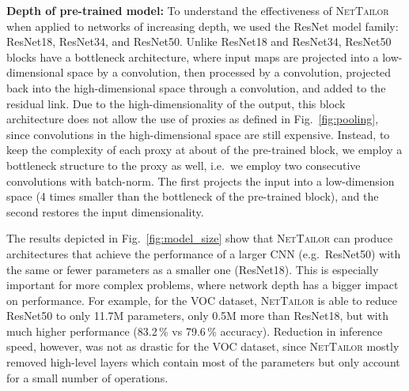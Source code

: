 \documentclass[10pt,twocolumn,letterpaper]{article}
\begin{document}
\noindent
\textbf{Depth of pre-trained model:}
To understand the effectiveness of \textsc{NetTailor} when applied to networks of increasing depth, we used the ResNet model family: ResNet18, ResNet34, and ResNet50. 
Unlike ResNet18 and ResNet34, ResNet50 blocks have a bottleneck architecture, where input maps are projected into a low-dimensional space by a  convolution, then processed by a  convolution, projected back into the high-dimensional space through a  convolution, and added to the residual link.
Due to the high-dimensionality of the output, this block architecture does not allow the use of proxies as defined in Fig.~\ref{fig:pooling}, since  convolutions in the high-dimensional space are still expensive.
Instead, to keep the complexity of each proxy at about  of the pre-trained block, we employ a bottleneck structure to the proxy as well, i.e.~we employ two consecutive  convolutions with batch-norm. The first projects the input into a low-dimension space (4 times smaller than the bottleneck of the pre-trained block), and the second restores the input dimensionality.

The results depicted in Fig.~\ref{fig:model_size} show that \textsc{NetTailor} can produce architectures that achieve the performance of a larger CNN (e.g.~ResNet50) with the same or fewer parameters as a smaller one (ResNet18). This is especially important for more complex problems, where network depth has a bigger impact on performance. For example, for the VOC dataset, \textsc{NetTailor} is able to reduce ResNet50 to only 11.7M parameters, only 0.5M more than ResNet18, but with much higher performance (83.2\,\% vs 79.6\,\% accuracy). Reduction in inference speed, however, was not as drastic for the VOC dataset, since \textsc{NetTailor} mostly removed high-level layers which contain most of the parameters but only account for a small number of operations.
\end{document}
